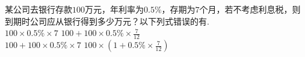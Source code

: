某公司去银行存款$100$万元，年利率为$0.5\%$，存期为$7$个月，若不考虑利息税，则到期时公司应从银行得到多少万元？以下列式错误的有\key{}.\\
$100\times0.5\%\times7$\qquad\qquad\qquad\qquad\qquad\qquad\quad
{}$100+100\times0.5\%\times\frac{7}{12}$\\
$100+100\times0.5\%\times7$\qquad\qquad\qquad\qquad\qquad
{}$100\times(1+0.5\%\times\frac{7}{12})$

